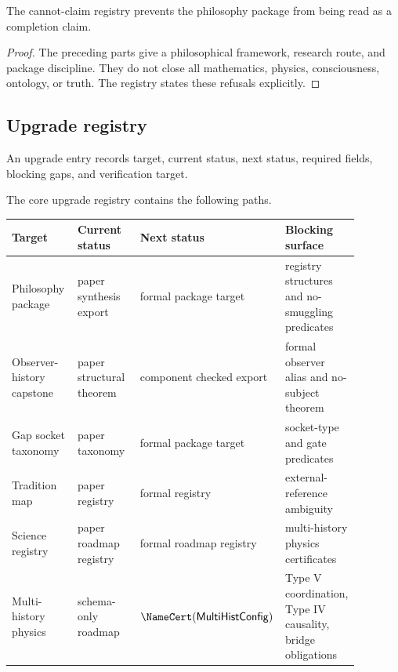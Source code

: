 \begin{theorem}
\label{thm:philosophy-cannot-claim-registry-protects}
The cannot-claim registry prevents the philosophy package from being
read as a completion claim.
\end{theorem}
\begin{proof}
The preceding parts give a philosophical framework, research route, and
package discipline. They do not close all mathematics, physics,
consciousness, ontology, or truth. The registry states these refusals
explicitly.
\end{proof}

\subsection{Upgrade registry}
\label{subsec:philosophy-upgrade-registry-table}

\begin{definition}
\label{def:philosophy-upgrade-entry}
An upgrade entry records target, current status, next status, required
fields, blocking gaps, and verification target.
\end{definition}

\begin{definition}
\label{def:philosophy-core-upgrade-registry}
The core upgrade registry contains the following paths.

\begin{center}
\begin{tabular}{p{0.22\linewidth}p{0.24\linewidth}p{0.22\linewidth}p{0.20\linewidth}}
\textbf{Target} & \textbf{Current status} & \textbf{Next status} & \textbf{Blocking surface} \\
\hline
Philosophy package & paper synthesis export & formal package target & registry structures and no-smuggling predicates \\
Observer-history capstone & paper structural theorem & component checked export & formal observer alias and no-subject theorem \\
Gap socket taxonomy & paper taxonomy & formal package target & socket-type and gate predicates \\
Tradition map & paper registry & formal registry & external-reference ambiguity \\
Science registry & paper roadmap registry & formal roadmap registry & multi-history physics certificates \\
Multi-history physics & schema-only roadmap & \(\NameCert(\mathsf{MultiHistConfig})\) & Type V coordination, Type IV causality, bridge obligations \\
\end{tabular}
\end{center}
\end{definition}

